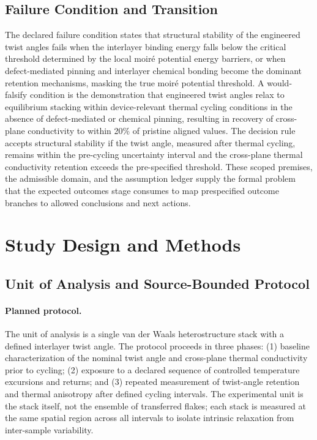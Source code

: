 \documentclass[conference]{IEEEtran}
\begin{document}
\subsection{Failure Condition and Transition}
The declared failure condition states that structural stability of the engineered twist angles fails when the interlayer binding energy falls below the critical threshold determined by the local moiré potential energy barriers, or when defect-mediated pinning and interlayer chemical bonding become the dominant retention mechanisms, masking the true moiré potential threshold. A would-falsify condition is the demonstration that engineered twist angles relax to equilibrium stacking within device-relevant thermal cycling conditions in the absence of defect-mediated or chemical pinning, resulting in recovery of cross-plane conductivity to within 20\% of pristine aligned values. The decision rule accepts structural stability if the twist angle, measured after thermal cycling, remains within the pre-cycling uncertainty interval and the cross-plane thermal conductivity retention exceeds the pre-specified threshold. These scoped premises, the admissible domain, and the assumption ledger supply the formal problem that the expected outcomes stage consumes to map prespecified outcome branches to allowed conclusions and next actions.

\section{Study Design and Methods}
\subsection{Unit of Analysis and Source-Bounded Protocol}
\paragraph{Planned protocol.} The unit of analysis is a single van der Waals heterostructure stack with a defined interlayer twist angle. The protocol proceeds in three phases: (1) baseline characterization of the nominal twist angle and cross-plane thermal conductivity prior to cycling; (2) exposure to a declared sequence of controlled temperature excursions and returns; and (3) repeated measurement of twist-angle retention and thermal anisotropy after defined cycling intervals. The experimental unit is the stack itself, not the ensemble of transferred flakes; each stack is measured at the same spatial region across all intervals to isolate intrinsic relaxation from inter-sample variability.~\cite{cite_26ecaf73d88dfe33,cite_7a8cfa26940e2a8f}
\end{document}
